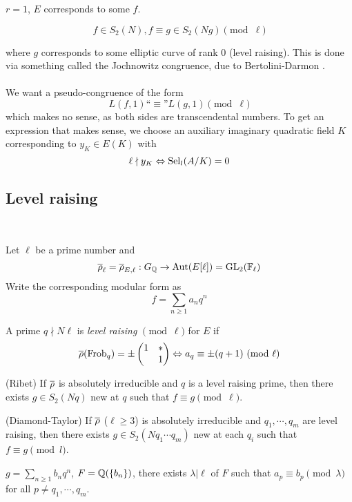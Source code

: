\documentclass[12pt,amsfont]{amsart}
\begin{document}
$r = 1$, $E$ corresponds to some $f$. 
 
\[f \in S_2(N), f \equiv g \in S_2(Ng) \pmod{\ell}\]

where $g$ corresponds to some elliptic curve of rank 0 (level raising). This is done via something called the Jochnowitz congruence, due to Bertolini-Darmon . \\ \\
We want a pseudo-congruence of the form
\[L(f,1) \text{``} \equiv\text{''} L(g, 1) \pmod{\ell}\]
which makes no sense, as both sides are transcendental numbers. To get an expression that makes sense, we choose an auxiliary imaginary quadratic field $K$ corresponding to $y_K \in E(K)$ with
\[\ell \nmid y_K \Leftrightarrow \operatorname{Sel}_l(A/K) = 0 \]

\subsection{Level raising}
{\ }

Let $\ell$ be a prime number and 
\[\overline{\rho}_\ell = \overline{\rho}_{E,\ell} : G_{\mathbb Q} \rightarrow \operatorname{Aut}(E[\ell]) = \operatorname{GL}_2({\mathbb F}_\ell)\]
Write the corresponding modular form as
\[f = \sum_{n \geq 1} a_n q^n\]

\begin{dfn} A prime $q \nmid N\ell$ is \emph{level raising} $\pmod{\ell}$ for $E$ if
\[\ol{\rho}(\operatorname{Frob}_q) = \pm \begin{pmatrix} 1 & \ast \\ & 1 \end{pmatrix} \Leftrightarrow a_q \equiv \pm (q + 1) \pmod{\ell} \]
\end{dfn}

\begin{thm} (Ribet) If $\overline{\rho}$ is absolutely irreducible and $q$ is a level raising prime, then there exists $g \in S_2(Nq)$ new at $q$ such that $f \equiv g \pmod{\ell}$.
\end{thm}

\begin{thm} (Diamond-Taylor) If $\overline{\rho}$ ($\ell \geq 3$) is absolutely irreducible and $q_1, \cdots, q_m$ are level raising, then there exists $g \in S_2(Nq_1 \cdots q_m)$ new at each $q_i$ such that $f \equiv g \pmod{l}$.
\end{thm}

\begin{rmk} $g = \displaystyle \sum_{n \geq 1} b_n q^n$, $F = {\mathbb Q}(\{b_n\})$, there exists $\lambda | \ell$ of $F$ such that $a_p \equiv b_p \pmod{\lambda}$ for all $p \ne q_1, \cdots, q_m$.
\end{rmk}
\end{document}
